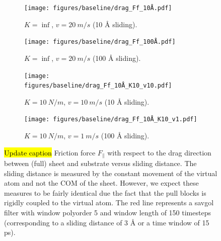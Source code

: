 \begin{figure}[H]
  \centering
  \begin{subfigure}[t]{0.49\textwidth}
      \centering
      \texttt{[image: figures/baseline/drag\_Ff\_10Å.pdf]}
      \caption{$K = \inf$, $v = \SI{20}{m/s}$ (10 Å sliding).}
      \label{fig:drag_Ff_10}
  \end{subfigure}
  \hfill
  \begin{subfigure}[t]{0.49\textwidth}
      \centering
      \texttt{[image: figures/baseline/drag\_Ff\_100Å.pdf]}
      \caption{$K = \inf$, $v = \SI{20}{m/s}$ (100 Å sliding).}
      \label{fig:drag_Ff_100}
    \end{subfigure}
    \hfill
    \begin{subfigure}[t]{0.49\textwidth}
      \centering
      \texttt{[image: figures/baseline/drag\_Ff\_10Å\_K10\_v10.pdf]}
      \caption{$K = \SI{10}{N/m}$, $v = \SI{10}{m/s}$ (10 Å sliding).}
      \label{fig:drag_Ff_10_K10_v10}
    \end{subfigure}
    \hfill
    \begin{subfigure}[t]{0.49\textwidth}
      \centering
      \texttt{[image: figures/baseline/drag\_Ff\_10Å\_K10\_v1.pdf]}
      \caption{$K = \SI{10}{N/m}$, $v = \SI{1}{m/s}$ (100 Å sliding).}
      \label{fig:drag_Ff_10_K10_v1}
  \end{subfigure}
  \hfill
     \caption{\hl{Update caption} Friction force $F_\parallel$ with respect to the drag direction between (full) sheet and substrate versus sliding distance. The sliding distance is measured by the constant movement of the virtual atom and not the COM of the sheet. However, we expect these measures to be fairly identical due the fact that the pull blocks is rigidly coupled to the virtual atom. The red line represents a savgol filter with window polyorder 5 and window length of 150 timesteps (corresponding to a sliding distance of 3 Å or a time window of 15 ps).}
     \label{fig:drag_Ff}
\end{figure}

